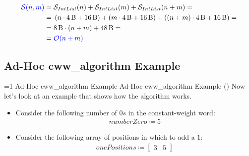             \begin{frame}{\cwwmergeaftersortrecursivecostframe}
                \begin{align*}
                    \textcolor{blue}{\mathcal{S}{\left(n , m\right)}} = & \; \mathcal{S}_{IntList}{\left(n\right)} + \mathcal{S}_{IntList}{\left(m\right)} + \mathcal{S}_{IntList}{\left(n + m\right)} = \\
                    = & \; \left(n \cdot \SI{4}{B} + \SI{16}{B}\right) + \left(m \cdot \SI{4}{B} + \SI{16}{B}\right) + \left(\left(n + m\right) \cdot \SI{4}{B} + \SI{16}{B}\right) = \\
                    = & \; \SI{8}{B} \cdot \left(n + m\right) + \SI{48}{B} =\\
                    = & \; \textcolor{blue}{\mathcal{O}{\left(n + m\right)}}
                \end{align*}
            \end{frame}

    \subsection{Ad-Hoc cww\_algorithm Example}
\setcounter{cwwalgortihmexamplecounter}{1}
\newcommand{\cwwalgortihmexampleframe}{%
    \ifnum\value{cwwalgortihmexamplecounter}=1
        Ad-Hoc cww\_algorithm Example%
    \else
        Ad-Hoc cww\_algorithm Example (\thecwwalgortihmexamplecounter)%
    \fi
}
        \begin{frame}{\cwwalgortihmexampleframe}
            Now let's look at an example that shows how the algorithm works.

            \begin{itemize}
                \item Consider the following number of $0s$ in the constant-weight word:
                \begin{align*}
                    numberZero \coloneqq 5
                \end{align*}

                \item Consider the following array of positions in which to add a $1$:
                \begin{align*}
                    onePositions \coloneqq \begin{bmatrix}
                        3 & 5 %
                    \end{bmatrix}
                \end{align*}
            \end{itemize}
\end{frame}

